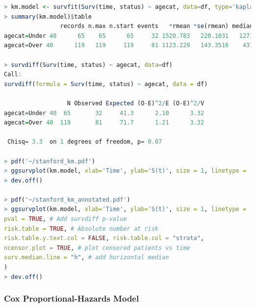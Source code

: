 \begin{lstlisting}[language=R]
> km.model <- survfit(Surv(time, status) ~ agecat, data=df, type='kaplan-meier')
> summary(km.model)$table
                records n.max n.start events   *rmean *se(rmean) median 0.95LCL 0.95UCL
agecat=Under 40      65    65      65     32 1520.783   220.1031   1271     731      NA
agecat=Over 40      119   119     119     81 1123.229   143.3516    431     202     897

> survdiff(Surv(time, status) ~ agecat, data=df)
Call:
survdiff(formula = Surv(time, status) ~ agecat, data = df)

                  N Observed Expected (O-E)^2/E (O-E)^2/V
agecat=Under 40  65       32     41.3      2.10      3.32
agecat=Over 40  119       81     71.7      1.21      3.32

 Chisq= 3.3  on 1 degrees of freedom, p= 0.07

> pdf('~/stanford_km.pdf')
> ggsurvplot(km.model, xlab='Time', ylab='S(t)', size = 1, linetype = 'strata', palette=c('#4e79a7', '#f28e2b'), conf.int = TRUE, legend = c(0.85, 0.85), legend.y = 1, legend.title = '', legend.labs = c('Under 40', 'Over 40'))
> dev.off()

> pdf('~/stanford_km_annotated.pdf')
> ggsurvplot(km.model, xlab='Time', ylab='S(t)', size = 1, linetype = 'strata', palette=c('#4e79a7', '#f28e2b'), conf.int = TRUE, legend = c(0.85, 0.85), legend.y = 1, legend.title = '', legend.labs = c('Under 40', 'Over 40'),
pval = TRUE, # Add survdiff p-value
risk.table = TRUE, # Absolute number at risk
risk.table.y.text.col = FALSE, risk.table.col = "strata",
ncensor.plot = TRUE, # plot censored patients vs time
surv.median.line = "h", # add horizontal median
)
> dev.off()
\end{lstlisting}

\subsubsection{Cox Proportional-Hazards Model}
\label{additional:Survival:Rcode:cox}

